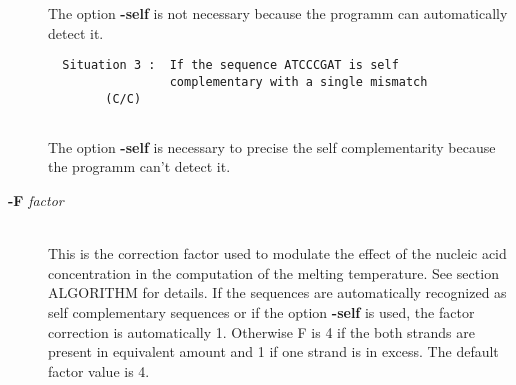 \documentclass{article}
\begin{document}
\begin{description}
\begin{verbatim}
  \end{verbatim}
    
  The option \textbf{-self} is not necessary because the programm 
  can automatically detect it.
  
  \begin{verbatim}  
  Situation 3 :  If the sequence ATCCCGAT is self 
                 complementary with a single mismatch 
		(C/C)
      
  \end{verbatim}
  		 
  The option \textbf{-self} is necessary to precise the self 
  complementarity because the programm can't detect it.
      
 \item [\textbf{-F} \textit{factor}  ]\mbox{}\\
  This is the correction factor used to modulate the effect of the nucleic acid concentration in the computation of the melting temperature. 
  See section ALGORITHM for details. If the sequences are automatically recognized as self complementary sequences or if the option \textbf{-self}
  is used, the factor correction is automatically 1. Otherwise F is 4 if the both strands are present in equivalent amount and 1 if one strand is in excess. 
  The default factor value is 4.
\end{description}
\end{document}
